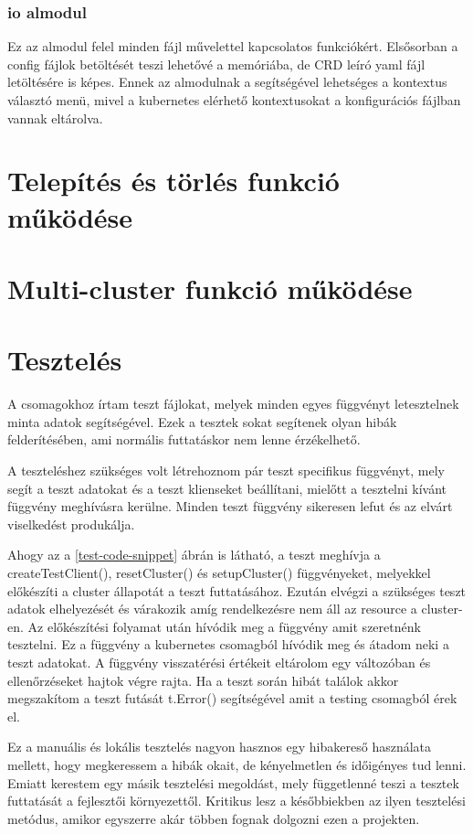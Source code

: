 \subsubsection*{io almodul}
Ez az almodul felel minden fájl művelettel kapcsolatos funkciókért.
Elsősorban a config fájlok betöltését teszi lehetővé a memóriába, de CRD leíró yaml fájl letöltésére is képes.
Ennek az almodulnak a segítségével lehetséges a kontextus választó menü, mivel a kubernetes elérhető kontextusokat a konfigurációs fájlban vannak eltárolva.

\section{Telepítés és törlés funkció működése}

\section{Multi-cluster funkció működése}

\section{Tesztelés}
A csomagokhoz írtam teszt fájlokat, melyek minden egyes függvényt letesztelnek minta adatok segítségével.
Ezek a tesztek sokat segítenek olyan hibák felderítésében, ami normális futtatáskor nem lenne érzékelhető.

A teszteléshez szükséges volt létrehoznom pár teszt specifikus függvényt, mely segít a teszt adatokat és a teszt klienseket beállítani, mielőtt a tesztelni kívánt függvény meghívásra kerülne. Minden teszt függvény sikeresen lefut és az elvárt viselkedést produkálja.

Ahogy az a \ref{test-code-snippet} ábrán is látható, a teszt meghívja a createTestClient(), resetCluster() és setupCluster() függvényeket, melyekkel előkészíti a cluster állapotát a teszt futtatásához.
Ezután elvégzi a szükséges teszt adatok elhelyezését és várakozik amíg rendelkezésre nem áll az resource a cluster-en.
Az előkészítési folyamat után hívódik meg a függvény amit szeretnénk tesztelni.
Ez a függvény a kubernetes csomagból hívódik meg és átadom neki a teszt adatokat.
A függvény visszatérési értékeit eltárolom egy változóban és ellenőrzéseket hajtok végre rajta.
Ha a teszt során hibát találok akkor megszakítom a teszt futását t.Error() segítségével amit a testing csomagból érek el.

Ez a manuális és lokális tesztelés nagyon hasznos egy hibakereső használata mellett, hogy megkeressem a hibák okait, de kényelmetlen és időigényes tud lenni.
Emiatt kerestem egy másik tesztelési megoldást, mely függetlenné teszi a tesztek futtatását a fejlesztői környezettől.
Kritikus lesz a későbbiekben az ilyen tesztelési metódus, amikor egyszerre akár többen fognak dolgozni ezen a projekten.

